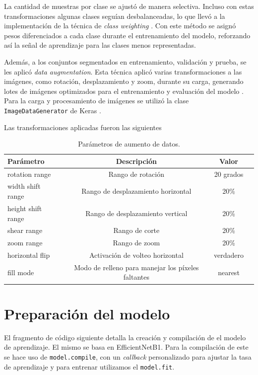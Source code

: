 La cantidad de muestras por clase se ajustó de manera selectiva. Incluso con estas transformaciones algunas clases seguían desbalanceadas, lo que llevó a la implementación de la técnica de \textit{class weighting} . Con este método se asignó pesos diferenciados a cada clase durante el entrenamiento del modelo, reforzando así la señal de aprendizaje para las clases menos representadas.

Además, a los conjuntos segmentados en entrenamiento, validación y prueba, se les aplicó \textit{data augmentation}. Esta técnica aplicó varias transformaciones a las imágenes, como rotación, desplazamiento y zoom, durante su carga, generando lotes de imágenes optimizados para el entrenamiento y evaluación del modelo . Para la carga y procesamiento de imágenes se utilizó la clase \texttt{ImageDataGenerator} de Keras .


Las transformaciones aplicadas fueron las siguientes

\begin{table}[H]
   \centering
   \begin{tabular}{lccc}
   \hline
   Parámetro & Descripción  & Valor \\ \hline
   rotation range & 	Rango de rotación & 20 grados \\
   width shift range & Rango de desplazamiento horizontal & 20\% \\
   height shift range & Rango de desplazamiento vertical & 20\% \\
   shear range & 	Rango de corte & 20\% \\
   zoom range & Rango de zoom & 20\% \\
   horizontal flip & Activación de volteo horizontal & verdadero \\
   fill mode & Modo de relleno para manejar los píxeles faltantes & nearest \\ \hline
   \end{tabular}
   \caption{Parámetros de aumento de datos.}
   \label{tab:data_augmentation_params}
   \end{table}
     

\section*{Preparación del modelo}

El fragmento de código siguiente detalla la creación y compilación de el modelo de aprendizaje. El mismo se basa en EfficientNetB1. Para la compilación de este se hace uso de \texttt{model.compile}, con un \textit{callback} personalizado para ajustar la tasa de aprendizaje y para entrenar utilizamos el \texttt{model.fit}.

